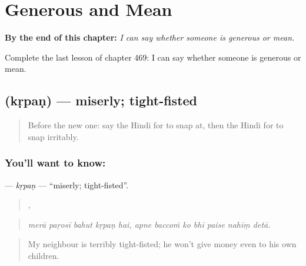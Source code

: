 
\chapter{Generous and Mean}
\label{ch:hi-generous-and-mean}

\begin{chapteropening}
\textbf{By the end of this chapter:} \emph{I can say whether someone is generous or mean.}

Complete the last lesson of chapter 469: I can say whether someone is generous or mean.
\end{chapteropening}

\section[\texorpdfstring{\hi{कृपण} (kṛpaṇ)}{कृपण (kṛpaṇ)}]{ (kṛpaṇ) — miserly; tight-fisted}

\label{lesson:HI-C469-krpan}



\begin{quote}
Before the new one: say the Hindi for to snap at, then the Hindi for to snap irritably.
\end{quote}

\subsection*{You'll want to know: }
\textbf{} — \emph{kṛpaṇ} — \textquotedblleft{}miserly; tight-fisted\textquotedblright{}.

\begin{quote}
    ,       
\end{quote}

\begin{quote}
\emph{merā paṛosī bahut kṛpaṇ hai, apne baccoṁ ko bhī paise nahīṃ detā.}
\end{quote}

\begin{quote}
My neighbour is terribly tight-fisted; he won't give money even to his own children.
\end{quote}

